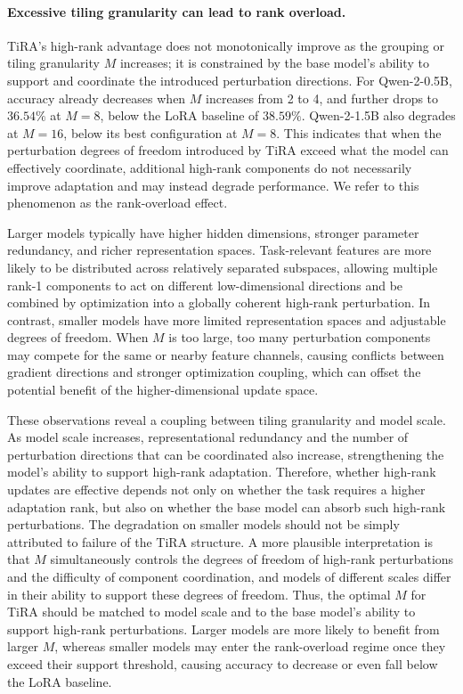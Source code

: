 \documentclass[a4paper,11pt]{article}
\begin{document}
\paragraph{Excessive tiling granularity can lead to rank overload.}
TiRA's high-rank advantage does not monotonically improve as the grouping or tiling granularity $M$ increases; it is constrained by the base model's ability to support and coordinate the introduced perturbation directions. For Qwen-2-0.5B, accuracy already decreases when $M$ increases from 2 to 4, and further drops to $36.54\%$ at $M=8$, below the LoRA baseline of $38.59\%$. Qwen-2-1.5B also degrades at $M=16$, below its best configuration at $M=8$. This indicates that when the perturbation degrees of freedom introduced by TiRA exceed what the model can effectively coordinate, additional high-rank components do not necessarily improve adaptation and may instead degrade performance. We refer to this phenomenon as the rank-overload effect.

Larger models typically have higher hidden dimensions, stronger parameter redundancy, and richer representation spaces. Task-relevant features are more likely to be distributed across relatively separated subspaces, allowing multiple rank-1 components to act on different low-dimensional directions and be combined by optimization into a globally coherent high-rank perturbation. In contrast, smaller models have more limited representation spaces and adjustable degrees of freedom. When $M$ is too large, too many perturbation components may compete for the same or nearby feature channels, causing conflicts between gradient directions and stronger optimization coupling, which can offset the potential benefit of the higher-dimensional update space.

These observations reveal a coupling between tiling granularity and model scale. As model scale increases, representational redundancy and the number of perturbation directions that can be coordinated also increase, strengthening the model's ability to support high-rank adaptation. Therefore, whether high-rank updates are effective depends not only on whether the task requires a higher adaptation rank, but also on whether the base model can absorb such high-rank perturbations. The degradation on smaller models should not be simply attributed to failure of the TiRA structure. A more plausible interpretation is that $M$ simultaneously controls the degrees of freedom of high-rank perturbations and the difficulty of component coordination, and models of different scales differ in their ability to support these degrees of freedom. Thus, the optimal $M$ for TiRA should be matched to model scale and to the base model's ability to support high-rank perturbations. Larger models are more likely to benefit from larger $M$, whereas smaller models may enter the rank-overload regime once they exceed their support threshold, causing accuracy to decrease or even fall below the LoRA baseline.
\end{document}
